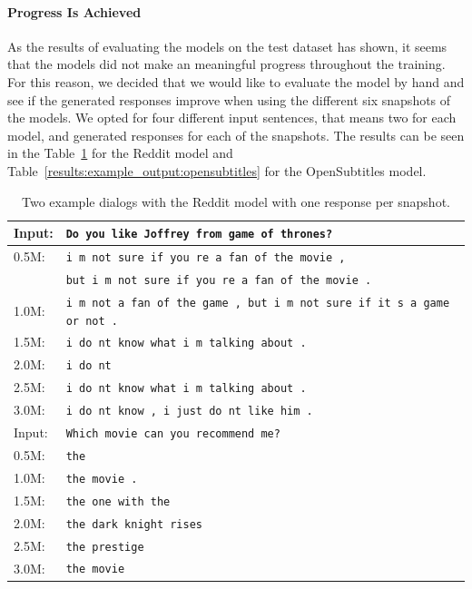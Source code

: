 \paragraph{Progress Is Achieved} As the results of evaluating the models on the test dataset has shown, it seems that the models did not make an meaningful progress throughout the training. For this reason, we decided that we would like to evaluate the model by hand and see if the generated responses improve when using the different six snapshots of the models. We opted for four different input sentences, that means two for each model, and generated responses for each of the snapshots. The results can be seen in the Table~\ref{results:example_output:reddit} for the Reddit model and Table~\ref{results:example_output:opensubtitles} for the OpenSubtitles model.

\begin{table}[H]
	\centering
	\begin{adjustbox}{max width=\textwidth}
		\begin{tabular}{ll}
			\toprule
			Input: 	& \texttt{Do you like Joffrey from game of thrones?}\\
			\midrule
			0.5M: 	& \texttt{i m not sure if you re a fan of the movie ,}\\
			& \texttt{but i m not sure if you re a fan of the movie .}\\
			1.0M: 	& \texttt{i m not a fan of the game , but i m not sure if it s a game or not .}\\
			1.5M:	& \texttt{i do nt know what i m talking about .}\\
			2.0M:	& \texttt{i do nt }\\
			2.5M:	& \texttt{i do nt know what i m talking about .}\\
			3.0M:	& \texttt{i do nt know , i just do nt like him .}\\
			\midrule
			Input: 	& \texttt{Which movie can you recommend me?}\\
			\midrule
			0.5M: 	& \texttt{the}\\
			1.0M: 	& \texttt{the movie .}\\
			1.5M:	& \texttt{the one with the}\\
			2.0M:	& \texttt{the dark knight rises}\\
			2.5M:	& \texttt{the prestige}\\
			3.0M:	& \texttt{the movie}\\
			\bottomrule
		\end{tabular}
	\end{adjustbox}
	\caption{Two example dialogs with the Reddit model with one response per snapshot.}
	\label{results:example_output:reddit}
\end{table}

